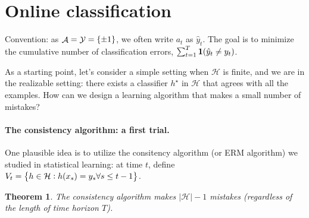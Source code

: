 \documentclass{article}
\newtheorem{theorem}{Theorem}
\DeclareMathOperator*{\Ycal}{{\cal Y}}
\DeclareMathOperator*{\Acal}{{\cal A}}
\newcommand{\Hcal}{\mathcal{H}}
\newcommand*{\one}{{\bf 1}}
\begin{document}
\section{Online classification}
Convention: as $\Acal = \Ycal = \cbr{\pm 1}$, we often write $a_t$ as $\hat{y}_t$. The goal is to minimize the cumulative number of classification errors, $\sum_{t=1}^T \one(\hat{y}_t \neq y_t)$.

As a starting point, let's consider a simple setting when $\Hcal$ is finite, and we are in the realizable setting: there exists a classifier $h^\star$ in $\Hcal$ that agrees with all the examples. How can we design a learning algorithm that makes a small number of mistakes?

\paragraph{The consistency algorithm: a first trial.} One plausible idea is to utilize the consitency algorithm (or ERM algorithm) we studied in statistical learning: at time $t$, define $V_t = \cbr{h \in \Hcal: h(x_s) = y_s \forall s \leq t-1}$.
\begin{theorem}
The consistency algorithm makes $|\Hcal| - 1$ mistakes (regardless of the length of time horizon $T$).
\end{theorem}
\end{document}
